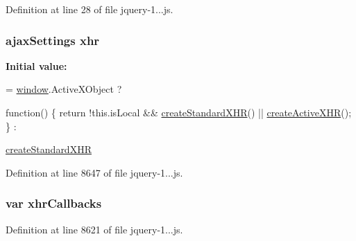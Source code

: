 Definition at line 28 of file jquery-\/1...\+js.

\hypertarget{_scripts_2jquery-1_810_82_8js_a0b7a5cb538ca9913b1b3b1c807ad06f0}{}
\subsubsection[{xhr}]{ ajax\+Settings xhr}\label{_scripts_2jquery-1_810_82_8js_a0b7a5cb538ca9913b1b3b1c807ad06f0}
{\bfseries Initial value\+:}
\begin{DoxyCode}
= \hyperlink{obj_2_release_2_package_2_package_tmp_2_scripts_2jquery-1_810_82_8js_a04a8a2bbfa9c15500892b8e5033d625b}{window}.ActiveXObject ?
    
    \textcolor{keyword}{function}() \{
        \textcolor{keywordflow}{return} !this.isLocal && \hyperlink{obj_2_release_2_package_2_package_tmp_2_scripts_2jquery-1_810_82_8js_acea019a8b67e4d114deb75d1e0b3474a}{createStandardXHR}() || 
      \hyperlink{obj_2_release_2_package_2_package_tmp_2_scripts_2jquery-1_810_82_8js_a54bf63f1b5f905292db45a1d6a9dc300}{createActiveXHR}();
    \} :
    
    \hyperlink{obj_2_release_2_package_2_package_tmp_2_scripts_2jquery-1_810_82_8js_acea019a8b67e4d114deb75d1e0b3474a}{createStandardXHR}
\end{DoxyCode}


Definition at line 8647 of file jquery-\/1...\+js.

\hypertarget{_scripts_2jquery-1_810_82_8js_a068f27a70831ff3a9e0ffa79e063847f}{}
\subsubsection[{xhr\+Callbacks}]{\setlength{\rightskip}{0pt plus 5cm}var xhr\+Callbacks}\label{_scripts_2jquery-1_810_82_8js_a068f27a70831ff3a9e0ffa79e063847f}


Definition at line 8621 of file jquery-\/1...\+js.

\hypertarget{_scripts_2jquery-1_810_82_8js_aa23ed64cf7afc9b028419517bf23fcea}{}
